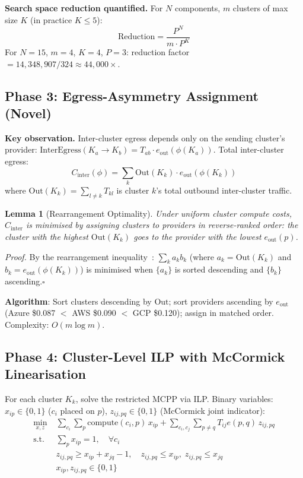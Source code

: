 \documentclass[sigconf,10pt]{acmart}
\newtheorem{lemma}[theorem]{Lemma}
\begin{document}
\textbf{Search space reduction quantified.}
For $N$ components, $m$ clusters of max size $K$ (in practice $K \leq 5$):
\begin{equation}\label{eq:reduction}
\text{Reduction} = \frac{P^N}{m \cdot P^K}
\end{equation}
For $N=15$, $m=4$, $K=4$, $P=3$: reduction factor $= 14{,}348{,}907 / 324 \approx 44{,}000\times$.

\subsection{Phase 3: Egress-Asymmetry Assignment (Novel)}

\textbf{Key observation.}
Inter-cluster egress depends only on the sending cluster's provider:
$\text{InterEgress}(K_a \to K_b) = T_{ab} \cdot e_{\text{out}}(\phi(K_a))$.
Total inter-cluster egress:
\begin{equation}\label{eq:inter}
C_{\text{inter}}(\phi) = \sum_k \text{Out}(K_k) \cdot e_{\text{out}}(\phi(K_k))
\end{equation}
where $\text{Out}(K_k) = \sum_{l \neq k} T_{kl}$ is cluster $k$'s total
outbound inter-cluster traffic.

\begin{lemma}[Rearrangement Optimality]\label{lem:rearrange}
Under uniform cluster compute costs, $C_{\text{inter}}$ is minimised by assigning
clusters to providers in reverse-ranked order: the cluster with the highest
$\text{Out}(K_k)$ goes to the provider with the lowest $e_{\text{out}}(p)$.
\end{lemma}

\textit{Proof.}
By the rearrangement inequality~\cite{hardy1952}: $\sum_k a_k b_k$ (where
$a_k = \text{Out}(K_k)$ and $b_k = e_{\text{out}}(\phi(K_k))$) is minimised
when $\{a_k\}$ is sorted descending and $\{b_k\}$ ascending.\hfill$\square$

\textbf{Algorithm}: Sort clusters descending by $\text{Out}$;
sort providers ascending by $e_{\text{out}}$ (Azure \$0.087 $<$ AWS \$0.090 $<$ GCP
\$0.120); assign in matched order.
Complexity: $O(m \log m)$.

\subsection{Phase 4: Cluster-Level ILP with McCormick Linearisation}

For each cluster $K_k$, solve the restricted MCPP via ILP.
Binary variables: $x_{ip} \in \{0,1\}$ ($c_i$ placed on $p$),
$z_{ij,pq} \in \{0,1\}$ (McCormick joint indicator):
\begin{align}
\min_{x,z}\; &
  \sum_{c_i}\!\sum_p \text{compute}(c_i,p)\,x_{ip}
  + \!\sum_{c_i,c_j}\!\sum_{p \neq q} T_{ij}e(p,q)\,z_{ij,pq}
\\
\text{s.t.}\; &
  \sum_p x_{ip}=1, \quad\forall c_i\\
& z_{ij,pq} \geq x_{ip}+x_{jq}-1, \quad z_{ij,pq} \leq x_{ip},\;
  z_{ij,pq} \leq x_{jq}\\
& x_{ip}, z_{ij,pq} \in \{0,1\}
\end{align}
\end{document}
